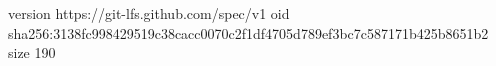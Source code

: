 version https://git-lfs.github.com/spec/v1
oid sha256:3138fc998429519c38cacc0070c2f1df4705d789ef3bc7c587171b425b8651b2
size 190
